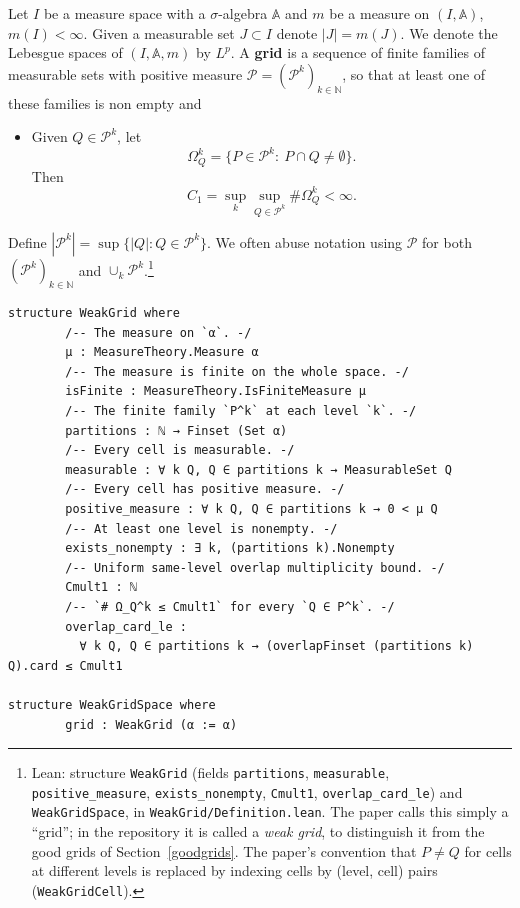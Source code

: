 \documentclass[11pt]{amsart}
\theoremstyle{definition}
\newcommand{\lean}[1]{\texttt{#1}}
\begin{document}
Let $I$ be a measure space with a $\sigma$-algebra $\mathbb{A}$ and $m$ be a
measure on $(I,\mathbb{A})$, $m(I)<\infty$. Given a measurable set $J\subset I$
denote $|J|=m(J)$. We denote the Lebesgue spaces of $(I,\mathbb{A},m)$ by
$L^p$. A {\bf grid} is a sequence of finite families of measurable sets with
positive measure $\mathcal{P}=(\mathcal{P}^k)_{k\in \mathbb{N}}$, so that at
least one of these families is non empty and
\begin{itemize}
\item[$G_1$.] Given $Q\in \mathcal{P}^k$, let
$$\Omega_Q^k=\{ P \in \mathcal{P}^k\colon \ P\cap Q\neq \emptyset \}.$$
Then
$$C_{1}=\sup_k \sup_{Q \in \mathcal{P}^k} \# \Omega_Q^k< \infty.$$
\end{itemize}
Define $|\mathcal{P}^k|=\sup \{|Q|\colon Q \in \mathcal{P}^k\}$. We often abuse
notation using $\mathcal{P}$ for both $(\mathcal{P}^k)_{k\in \mathbb{N}}$ and
$\cup_k \mathcal{P}^k$.\footnote{Lean: structure \lean{WeakGrid} (fields
\lean{partitions}, \lean{measurable}, \lean{positive\_measure},
\lean{exists\_nonempty}, \lean{Cmult1}, \lean{overlap\_card\_le}) and
\lean{WeakGridSpace}, in \lean{WeakGrid/Definition.lean}. The paper calls
this simply a ``grid''; in the repository it is called a \emph{weak grid}, to
distinguish it from the good grids of Section~\ref{goodgrids}. The paper's
convention that $P \neq Q$ for cells at different levels is replaced by
indexing cells by (level, cell) pairs (\lean{WeakGridCell}).}
\begin{lstlisting}[style=lean]
structure WeakGrid where
        /-- The measure on `α`. -/
        μ : MeasureTheory.Measure α
        /-- The measure is finite on the whole space. -/
        isFinite : MeasureTheory.IsFiniteMeasure μ
        /-- The finite family `P^k` at each level `k`. -/
        partitions : ℕ → Finset (Set α)
        /-- Every cell is measurable. -/
        measurable : ∀ k Q, Q ∈ partitions k → MeasurableSet Q
        /-- Every cell has positive measure. -/
        positive_measure : ∀ k Q, Q ∈ partitions k → 0 < μ Q
        /-- At least one level is nonempty. -/
        exists_nonempty : ∃ k, (partitions k).Nonempty
        /-- Uniform same-level overlap multiplicity bound. -/
        Cmult1 : ℕ
        /-- `# Ω_Q^k ≤ Cmult1` for every `Q ∈ P^k`. -/
        overlap_card_le :
          ∀ k Q, Q ∈ partitions k → (overlapFinset (partitions k) Q).card ≤ Cmult1

structure WeakGridSpace where
        grid : WeakGrid (α := α)
\end{lstlisting}
\end{document}
